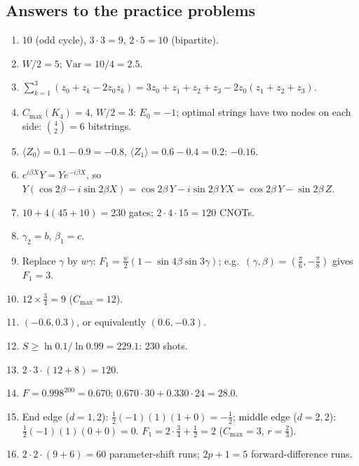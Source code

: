 \documentclass[11pt,a4paper,openany]{book}
\begin{document}
\newpage
\subsection*{Answers to the practice problems}
\begin{enumerate}[label=\textbf{P\arabic*.}, leftmargin=2.6em, itemsep=3pt]
\item $10$ (odd cycle), $3\cdot3 = 9$, $2\cdot5 = 10$ (bipartite).
\item $W/2 = 5$; $\mathrm{Var} = 10/4 = 2.5$.
\item $\sum_{k=1}^{3}(z_0 + z_k - 2z_0z_k) = 3z_0 + z_1 + z_2 + z_3 - 2z_0(z_1 + z_2 + z_3)$.
\item $C_{\max}(K_4) = 4$, $W/2 = 3$: $E_0 = -1$; optimal strings have two nodes on each side: $\binom42 = 6$ bitstrings.
\item $\langle Z_0\rangle = 0.1 - 0.9 = -0.8$, $\langle Z_1\rangle = 0.6 - 0.4 = 0.2$: $-0.16$.
\item $e^{i\beta X}Y = Ye^{-i\beta X}$, so $Y(\cos2\beta - i\sin2\beta X) = \cos2\beta\,Y - i\sin2\beta\,YX = \cos2\beta\,Y - \sin2\beta\,Z$.
\item $10 + 4(45 + 10) = 230$ gates; $2\cdot4\cdot15 = 120$ CNOTs.
\item $\gamma_2 = b$, $\beta_1 = c$.
\item Replace $\gamma$ by $w\gamma$: $F_1 = \frac w2(1 - \sin4\beta\sin3\gamma)$; e.g.\ $(\gamma, \beta) = (\frac\pi6, -\frac\pi8)$ gives $F_1 = 3$.
\item $12\times\frac34 = 9$ ($C_{\max} = 12$).
\item $(-0.6, 0.3)$, or equivalently $(0.6, -0.3)$.
\item $S \ge \ln0.1/\ln0.99 = 229.1$: $230$ shots.
\item $2\cdot3\cdot(12 + 8) = 120$.
\item $F = 0.998^{200} = 0.670$; $0.670\cdot30 + 0.330\cdot24 = 28.0$.
\item End edge ($d = 1, 2$): $\frac12(-1)(1)(1 + 0) = -\frac12$; middle edge ($d = 2, 2$): $\frac12(-1)(1)(0 + 0) = 0$. $F_1 = 2\cdot\frac34 + \frac12 = 2$ ($C_{\max} = 3$, $r = \frac23$).
\item $2\cdot2\cdot(9 + 6) = 60$ parameter-shift runs; $2p + 1 = 5$ forward-difference runs.
\end{enumerate}
\end{document}
